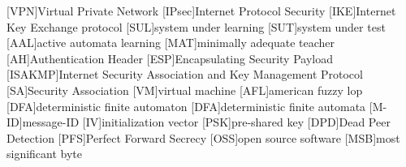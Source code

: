 \begin{acronym}
	[VPN]{Virtual Private Network}
	[IPsec]{Internet Protocol Security}
	[IKE]{Internet Key Exchange protocol}
	[SUL]{system under learning}
	[SUT]{system under test}
	[AAL]{active automata learning}
	[MAT]{minimally adequate teacher}
	[AH]{Authentication Header}
	[ESP]{Encapsulating Security Payload}
	[ISAKMP]{Internet Security Association and Key Management Protocol}
	[SA]{Security Association}
	[VM]{virtual machine}
	[AFL]{american fuzzy lop}
	[DFA]{deterministic finite automaton}
	[DFA]{deterministic finite automata}
	[M-ID]{message-ID}
	[IV]{initialization vector}
	[PSK]{pre-shared key}
	[DPD]{Dead Peer Detection}
	[PFS]{Perfect Forward Secrecy}
	[OSS]{open source software}
	[MSB]{most significant byte}
\end{acronym}